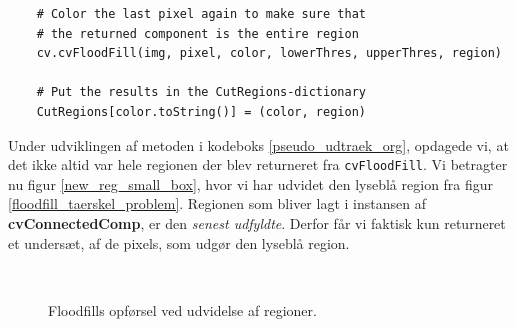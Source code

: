 {\begin{lstlisting}
    # Color the last pixel again to make sure that
    # the returned component is the entire region
    cv.cvFloodFill(img, pixel, color, lowerThres, upperThres, region)

    # Put the results in the CutRegions-dictionary
    CutRegions[color.toString()] = (color, region)
\end{lstlisting}
Under udviklingen af metoden i kodeboks \ref{pseudo_udtraek_org},
opdagede vi, at det ikke altid var hele regionen der blev returneret fra
\texttt{cvFloodFill}. Vi betragter nu figur \ref{new_reg_small_box},
hvor vi har udvidet den lyseblå region fra figur
\ref{floodfill_taerskel_problem}. Regionen som bliver lagt i instansen
af \textbf{cvConnectedComp}, er den \emph{senest udfyldte}. Derfor får vi
faktisk kun returneret et undersæt, af de pixels, som udgør den lyseblå
region.

\begin{figure}[!h]
    \setlength\fboxsep{0pt}
    \setlength\fboxrule{0.5pt}
    \centering
    \\
    \caption[]{
    Floodfills opførsel ved udvidelse af regioner.
    }
    \label{floodfill_return_entire_region}
\end{figure}

}
